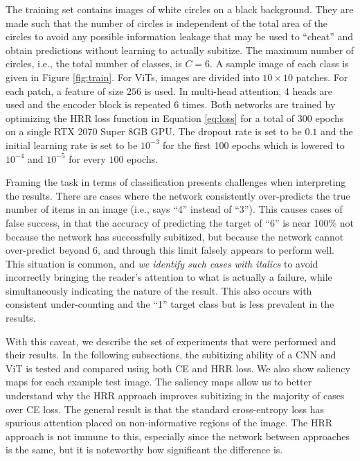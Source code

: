 \documentclass[letterpaper]{article} %
\begin{document}
The training set contains images of white circles on a black background. They are made such that the number of circles is independent of the total area of the circles to avoid any possible information leakage that may be used to ``cheat'' and obtain predictions without learning to actually subitize. The maximum number of circles, i.e., the total number of classes, is $C=6$. A sample image of each class is given in Figure \ref{fig:train}. For ViTs, images are divided into $10 \times 10$ patches. For each patch, a feature of size $256$ is used. In multi-head attention, 4 heads are used and the encoder block is repeated 6 times. Both networks are trained by optimizing the HRR loss function in Equation \ref{eq:loss} for a total of $300$ epochs on a single RTX 2070 Super 8GB GPU. The dropout rate is set to be $0.1$ and the initial learning rate is set to be $10^{-3}$ for the first 100 epochs which is lowered to $10^{-4}$ and $10^{-5}$ for every $100$ epochs.
\par
Framing the task in terms of classification presents challenges when interpreting the results. There are cases where the network consistently over-predicts the true number of items in an image (i.e., says ``4'' instead of ``3''). This causes cases of false success, in that the accuracy of predicting the target of ``6'' is near 100\% not because the network has successfully subitized, but because the network cannot over-predict beyond 6, and through this limit falsely appears to perform well. This situation is common, and \textit{we identify such cases with italics} to avoid incorrectly bringing the reader's attention to what is actually a failure, while simultaneously indicating the nature of the result. This also occurs with consistent under-counting and the ``1'' target class but is less prevalent in the results.
\par
With this caveat, we describe the set of experiments that were performed and their results. In the following subsections, the subitizing ability of a CNN and ViT is tested and compared using both CE and HRR loss. We also show saliency maps \cite{saliency} for each example test image. The saliency maps allow us to better understand why the HRR approach improves subitizing in the majority of cases over CE loss. The general result is that the standard cross-entropy loss has spurious attention placed on non-informative regions of the image. The HRR approach is not immune to this, especially since the network between approaches is the same, but it is noteworthy how significant the difference is.
\end{document}
